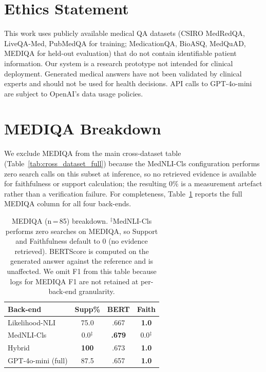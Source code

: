 \documentclass[11pt]{article}
\begin{document}
\section*{Ethics Statement}

This work uses publicly available medical QA datasets (CSIRO MedRedQA, LiveQA-Med, PubMedQA for training; MedicationQA, BioASQ, MedQuAD, MEDIQA for held-out evaluation) that do not contain identifiable patient information.
Our system is a research prototype not intended for clinical deployment.
Generated medical answers have not been validated by clinical experts and should not be used for health decisions.
API calls to GPT-4o-mini are subject to OpenAI's data usage policies.


% 


%


\section{MEDIQA Breakdown}
\label{app:mediqa}

We exclude MEDIQA from the main cross-dataset table
(Table~\ref{tab:cross_dataset_full}) because the
MedNLI-Cls configuration performs zero search
calls on this subset at inference, so no retrieved
evidence is available for faithfulness or support
calculation; the resulting 0\% is a measurement
artefact rather than a verification failure. For
completeness, Table~\ref{tab:mediqa} reports the full
MEDIQA column for all four back-ends.

\begin{table}[h]
\centering\small
\setlength{\tabcolsep}{6pt}
\begin{tabular}{@{}lccc@{}}
\toprule
\textbf{Back-end} & \textbf{Supp\%} & \textbf{BERT} & \textbf{Faith} \\
\midrule
Likelihood-NLI & 75.0 & .667 & \textbf{1.0} \\
MedNLI-Cls  & 0.0$^{\ddagger}$ & \textbf{.679} & 0.0$^{\ddagger}$ \\
Hybrid             & \textbf{100} & .673 & \textbf{1.0} \\
GPT-4o-mini (full) & 87.5 & .657 & \textbf{1.0} \\
\bottomrule
\end{tabular}
\caption{MEDIQA (n\,=\,85) breakdown. $^{\ddagger}$MedNLI-Cls performs zero searches on MEDIQA, so Support and Faithfulness default to 0 (no evidence retrieved). BERTScore is computed on the generated answer against the reference and is unaffected. We omit F1 from this table because logs for MEDIQA F1 are not retained at per-back-end granularity.}
\label{tab:mediqa}
\end{table}
\end{document}
